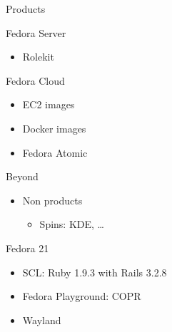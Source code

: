 \begin{frame}{Products}
    \item Fedora Server
      \begin{itemize}
        \item Rolekit
      \end{itemize}
    \item Fedora Cloud
      \begin{itemize}
        \item EC2 images
        \item Docker images
        \item Fedora Atomic
      \end{itemize}
\end{frame}

\begin{frame}{Beyond}
  \begin{itemize}
    \item Non products
      \begin{itemize}
        \item Spins: KDE, \ldots
      \end{itemize}
  \end{itemize}
\end{frame}

\begin{frame}{Fedora 21}
  \begin{itemize}
    \item SCL: Ruby 1.9.3 with Rails 3.2.8
    \item Fedora Playground: COPR
    \item Wayland
  \end{itemize}
\end{frame}
